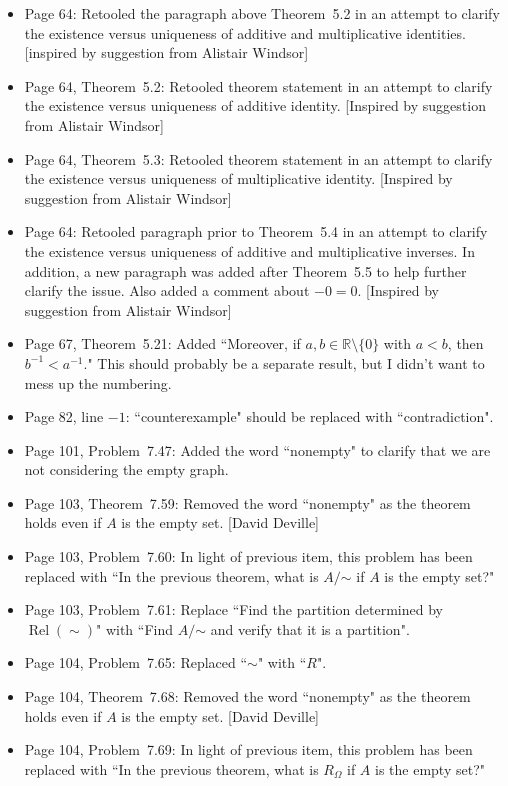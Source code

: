 \documentclass[11pt]{article}%
\newcommand{\Rel}{\operatorname{Rel}}
\begin{document}
\begin{itemize}
\item Page 64: Retooled the paragraph above Theorem~5.2 in an attempt to clarify the existence versus uniqueness of additive and multiplicative identities. [inspired by suggestion from Alistair Windsor]
\item Page 64, Theorem~5.2: Retooled theorem statement in an attempt to clarify the existence versus uniqueness of additive identity. [Inspired by suggestion from Alistair Windsor]
\item Page 64, Theorem~5.3: Retooled theorem statement in an attempt to clarify the existence versus uniqueness of multiplicative identity. [Inspired by suggestion from Alistair Windsor]
\item Page 64: Retooled paragraph prior to Theorem~5.4 in an attempt to clarify the existence versus uniqueness of additive and multiplicative inverses. In addition, a new paragraph was added after Theorem~5.5 to help further clarify the issue. Also added a comment about $-0=0$. [Inspired by suggestion from Alistair Windsor]
\item Page 67, Theorem~5.21: Added ``Moreover, if $a,b\in \mathbb{R}\setminus\{0\}$ with $a<b$, then $b^{-1}<a^{-1}$." This should probably be a separate result, but I didn't want to mess up the numbering.
\item Page 82, line $-1$: ``counterexample" should be replaced with ``contradiction". 
\item Page 101, Problem~7.47: Added the word ``nonempty" to clarify that we are not considering the empty graph.
\item Page 103, Theorem~7.59: Removed the word ``nonempty" as the theorem holds even if $A$ is the empty set. [David Deville]
\item Page 103, Problem~7.60: In light of previous item, this problem has been replaced  with ``In the previous theorem, what is $A/\mathord\sim$ if $A$ is the empty set?"
\item Page 103, Problem~7.61: Replace ``Find the partition determined by $\Rel(\sim)$" with ``Find $A/\mathord\sim$ and verify that it is a partition".
\item Page 104, Problem~7.65: Replaced ``$\sim$" with ``$R$".
\item Page 104, Theorem~7.68: Removed the word ``nonempty" as the theorem holds even if $A$ is the empty set. [David Deville]
\item Page 104, Problem~7.69: In light of previous item, this problem has been replaced  with ``In the previous theorem, what is $R_{\Omega}$ if $A$ is the empty set?"

\end{itemize}
\end{document}
